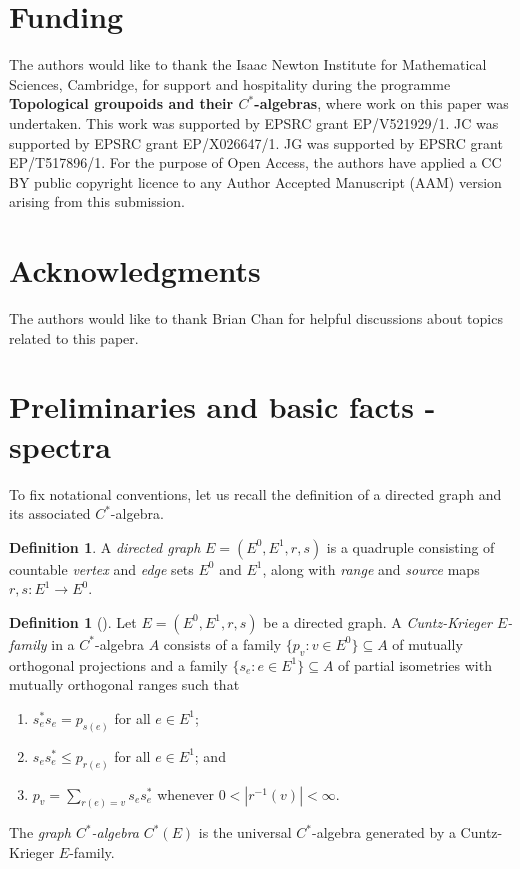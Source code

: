 \documentclass[12pt, a4paper]
{amsart}
\theoremstyle{definition}
\newtheorem{defin}[thm]{Definition}
\theoremstyle{remark}
\numberwithin{equation}{section}
\newcommand{\Cstar}{\ensuremath{C^*}}
\begin{document}
\section*{Funding}
\begin{sloppypar}
The authors would like to thank the Isaac Newton Institute for Mathematical Sciences, Cambridge, for support and hospitality during the programme {\bf{Topological groupoids and their $C^{*}$-algebras}}, where work on this paper was undertaken. This work was supported by EPSRC grant EP/V521929/1. JC was supported by EPSRC grant EP/X026647/1. JG was supported by EPSRC grant EP/T517896/1. For the purpose of Open Access, the authors have applied a CC BY public copyright licence to any Author Accepted Manuscript (AAM) version arising from this submission.
\end{sloppypar}


\section*{Acknowledgments}

The authors would like to thank Brian Chan for helpful discussions about topics related to this paper.



\section{Preliminaries and basic facts - spectra}
\label{sec:prelims}

To fix notational conventions, let us recall the definition of a directed graph and its associated \Cstar-algebra.

\begin{defin}
    A \emph{directed graph} $E = (E^0, E^1, r, s)$ is a quadruple consisting of countable \emph{vertex} and \emph{edge} sets $E^0$ and $E^1$, along with \emph{range} and \emph{source} maps $r,s\colon E^1 \to E^0$.
\end{defin}

\begin{defin}[{\cite[Definition~1]{Fowler-Laca-Raeburn}}]\label{def:graph}
    Let $ E = (E^0, E^1, r, s)$ be a directed graph. A \emph{Cuntz-Krieger $E$-family} in a \Cstar-algebra $A$ consists of a family $\{p_v \colon v \in E^0\} \subseteq A$ of mutually orthogonal projections and a family $\{s_e \colon e \in E^1\} \subseteq A$ of partial isometries with mutually orthogonal ranges such that
    \begin{enumerate}[label=(\roman*)]
        \item $s_e^*s_e = p_{s(e)}$ for all $e \in E^1$;
        \item $s_e s_e^* \le p_{r(e)}$ for all $e \in E^1$; and
        \item $p_v = \sum_{r(e)=v} s_e s_e^*$ whenever $0 < |r^{-1}(v)| < \infty$.
    \end{enumerate}
    The \emph{graph \Cstar-algebra} $\Cstar(E)$ is the universal $\Cstar$-algebra generated by a Cuntz-Krieger $E$-family.
\end{defin}
\end{document}
